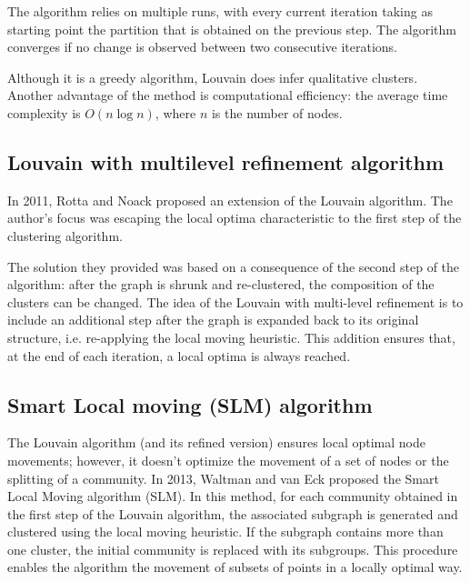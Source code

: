 The algorithm relies on multiple runs, with every current iteration taking as starting point the partition that is obtained on the previous step. The algorithm converges if no change is observed between two consecutive iterations.

Although it is a greedy algorithm, Louvain does infer qualitative clusters. Another advantage of the method is computational efficiency: the average time complexity is $O(n \log n)$, where $n$ is the number of nodes.


\subsection{Louvain with multilevel refinement algorithm}
In 2011, Rotta and Noack \cite{Rotta2011} proposed an extension of the Louvain algorithm. The author's focus was escaping the local optima characteristic to the first step of the clustering algorithm. 

The solution they provided was based on a consequence of the second step of the algorithm: after the graph is shrunk and re-clustered, the composition of the clusters can be changed. The idea of the Louvain with multi-level refinement is to include an additional step after the graph is expanded back to its original structure, i.e. re-applying the local moving heuristic. This addition ensures that, at the end of each iteration, a local optima is always reached.

\subsection{Smart Local moving (SLM) algorithm}
The Louvain algorithm (and its refined version) ensures local optimal node movements; however, it doesn't optimize the movement of a set of nodes or the splitting of a community. In 2013, Waltman and van Eck \cite{Waltman2013} proposed the Smart Local Moving algorithm (SLM). In this method, for each community obtained in the first step of the Louvain algorithm, the associated subgraph is generated and clustered using the local moving heuristic. If the subgraph contains more than one cluster, the initial community is replaced with its subgroups. This procedure enables the algorithm the movement of subsets of points in a locally optimal way. 

